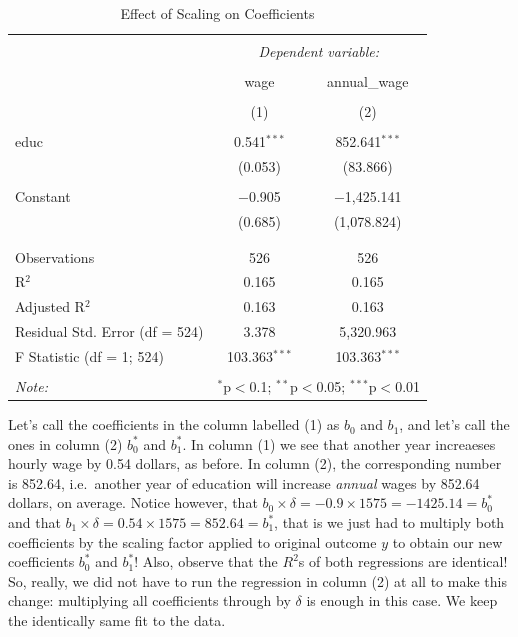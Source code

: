 \documentclass[]{book}
\begin{document}
\begin{table}[!htbp] \centering 
  \caption{Effect of Scaling on Coefficients} 
  \label{} 
\begin{tabular}{@{\extracolsep{5pt}}lcc} 
\\[-1.8ex]\hline 
\hline \\[-1.8ex] 
 & \multicolumn{2}{c}{\textit{Dependent variable:}} \\ 
\cline{2-3} 
\\[-1.8ex] & wage & annual\_wage \\ 
\\[-1.8ex] & (1) & (2)\\ 
\hline \\[-1.8ex] 
 educ & 0.541$^{***}$ & 852.641$^{***}$ \\ 
  & (0.053) & (83.866) \\ 
  & & \\ 
 Constant & $-$0.905 & $-$1,425.141 \\ 
  & (0.685) & (1,078.824) \\ 
  & & \\ 
\hline \\[-1.8ex] 
Observations & 526 & 526 \\ 
R$^{2}$ & 0.165 & 0.165 \\ 
Adjusted R$^{2}$ & 0.163 & 0.163 \\ 
Residual Std. Error (df = 524) & 3.378 & 5,320.963 \\ 
F Statistic (df = 1; 524) & 103.363$^{***}$ & 103.363$^{***}$ \\ 
\hline 
\hline \\[-1.8ex] 
\textit{Note:}  & \multicolumn{2}{r}{$^{*}$p$<$0.1; $^{**}$p$<$0.05; $^{***}$p$<$0.01} \\ 
\end{tabular} 
\end{table}

Let's call the coefficients in the column labelled (1) as \(b_0\) and \(b_1\), and let's call the ones in column (2) \(b_0^*\) and \(b_1^*\). In column (1) we see that another year increaeses hourly wage by 0.54 dollars, as before. In column (2), the corresponding number is 852.64, i.e.~another year of education will increase \emph{annual} wages by 852.64 dollars, on average. Notice however, that \(b_0 \times \delta = -0.9 \times 1575 = -1425.14 = b_0^*\) and that \(b_1 \times \delta = 0.54 \times 1575 = 852.64 = b_1^*\), that is we just had to multiply both coefficients by the scaling factor applied to original outcome \(y\) to obtain our new coefficients \(b_0^*\) and \(b_1^*\)! Also, observe that the \(R^2\)s of both regressions are identical! So, really, we did not have to run the regression in column (2) at all to make this change: multiplying all coefficients through by \(\delta\) is enough in this case. We keep the identically same fit to the data.
\end{document}

